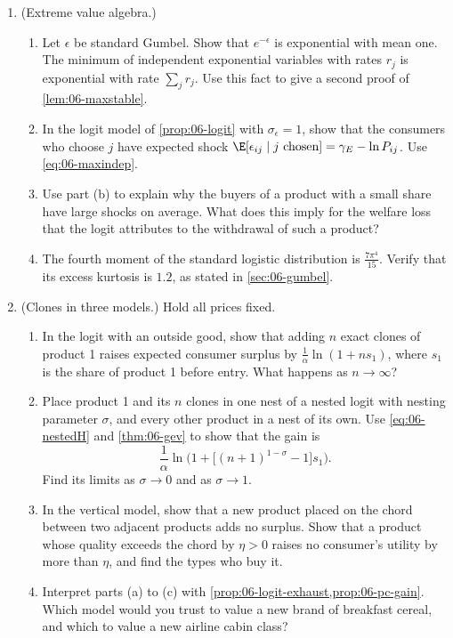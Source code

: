 \begin{enumerate}[label=\arabic*., leftmargin=*, itemsep=6pt]
\item (Extreme value algebra.)
\begin{enumerate}[label=(\alph*)]
  \item Let $\epsilon$ be standard Gumbel. Show that $e^{-\epsilon}$ is exponential with mean one. The minimum of
  independent exponential variables with rates $r_j$ is exponential with rate $\sum_j r_j$. Use this fact to give a
  second proof of \cref{lem:06-maxstable}.
  \item In the logit model of \cref{prop:06-logit} with $\sigma_\epsilon = 1$, show that the consumers who choose $j$
  have expected shock $\E[\epsilon_{ij} \mid j \text{ chosen}] = \gamma_E - \ln P_{ij}$. Use \eqref{eq:06-maxindep}.
  \item Use part (b) to explain why the buyers of a product with a small share have large shocks on average. What
  does this imply for the welfare loss that the logit attributes to the withdrawal of such a product?
  \item The fourth moment of the standard logistic distribution is $\frac{7\pi^4}{15}$. Verify that its excess
  kurtosis is $1.2$, as stated in \cref{sec:06-gumbel}.
\end{enumerate}

\item (Clones in three models.) Hold all prices fixed.
\begin{enumerate}[label=(\alph*)]
  \item In the logit with an outside good, show that adding $n$ exact clones of product 1 raises expected consumer
  surplus by $\frac{1}{\alpha}\ln(1 + ns_1)$, where $s_1$ is the share of product 1 before entry. What happens as
  $n \to \infty$?
  \item Place product 1 and its $n$ clones in one nest of a nested logit with nesting parameter $\sigma$, and every
  other product in a nest of its own. Use \eqref{eq:06-nestedH} and \cref{thm:06-gev} to show that the gain is
  \begin{equation*}
    \frac{1}{\alpha}\ln\Big(1 + \big[(n+1)^{1-\sigma} - 1\big]s_1\Big).
  \end{equation*}
  Find its limits as $\sigma \to 0$ and as $\sigma \to 1$.
  \item In the vertical model, show that a new product placed on the chord between two adjacent products adds no
  surplus. Show that a product whose quality exceeds the chord by $\eta > 0$ raises no consumer's utility by more than
  $\eta$, and find the types who buy it.
  \item Interpret parts (a) to (c) with \cref{prop:06-logit-exhaust,prop:06-pc-gain}. Which model would you trust to
  value a new brand of breakfast cereal, and which to value a new airline cabin class?
\end{enumerate}


\end{enumerate}

